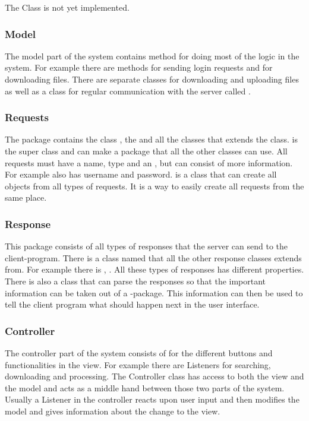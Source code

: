 The  Class is not yet implemented.

\subsubsection{Model}
The model part of the system contains method for doing most of the logic in the system. For example there are methods for sending login requests and for downloading files. There are separate classes for downloading and uploading files as well as a class for regular communication with the server called .

\subsubsection{Requests}
The  package contains the  class , the  and all the classes that extends the  class.  is the super class and can make a  package that all the other  classes can use. All requests must have a name, type and an , but can consist of more information. For example  also has username and password.  is a class that can create all objects from all types of requests. It is a way to easily create all requests from the same place.


\subsubsection{Response}
This package consists of all types of responses that the server can send to the client-program. There is a class named  that all the other response classes extends from. For example there is , . All these types of responses has different properties. There is also a class  that can parse the responses so that the important information can be taken out of a -package. This information can then be used to tell the client program what should happen next in the user interface. 


\subsubsection{Controller}
The controller part of the system consists of  for the different buttons and functionalities in the view. For example there are Listeners for searching, downloading and processing. The Controller class has access to both the view and the model and acts as a middle hand between those two parts of the system. Usually a Listener in the controller reacts upon user input and then modifies the model and gives information about the change to the view.
\FloatBarrier

